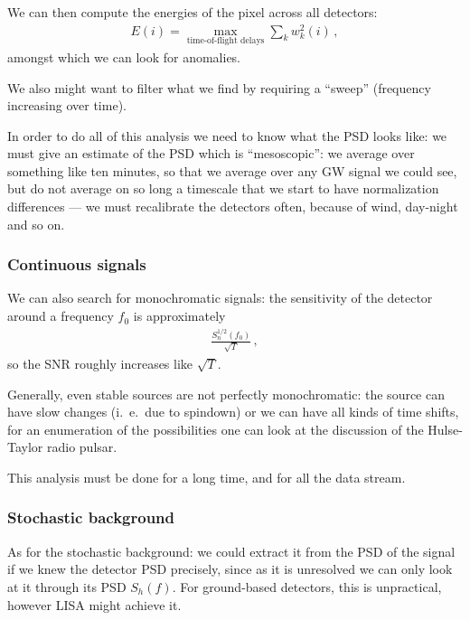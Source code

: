 \documentclass[main.tex]{subfiles}
\begin{document}
We can then compute the energies of the pixel across all detectors: 
%
\begin{align}
E(i) = \max_{\text{time-of-flight delays}} \sum _{k} w_k^2(i)
\,,
\end{align}
%
amongst which we can look for anomalies.

We also might want to filter what we find by requiring a ``sweep'' (frequency increasing over time). 


In order to do all of this analysis we need to know what the PSD looks like: we must give an estimate of the PSD which is ``mesoscopic'': we average over something like ten minutes, so that we average over any GW signal we could see, but do not average on so long a timescale that we start to have normalization differences --- we must recalibrate the detectors often, because of wind, day-night and so on.

\subsubsection{Continuous signals}

We can also search for monochromatic signals: the sensitivity of the detector around a frequency \(f_0 \) is approximately 
%
\begin{align}
\frac{S_n^{1/2} (f_0 )}{\sqrt{T}}
\,,
\end{align}
%
so the SNR roughly increases like \(\sqrt{T}\). 

Generally, even stable sources are not perfectly monochromatic: the source can have slow changes (i.\ e.\ due to spindown) or we can have all kinds of time shifts, for an enumeration of the possibilities one can look at the discussion of the Hulse-Taylor radio pulsar. 


This analysis must be done for a long time, and for all the data stream.

\subsubsection{Stochastic background}

As for the stochastic background: we could extract it from the PSD of the signal if we knew the detector PSD precisely, since as it is unresolved we can only look at it through its PSD \(S_h (f)\). 
For ground-based detectors, this is unpractical, however LISA might 
achieve it. 
\end{document}
